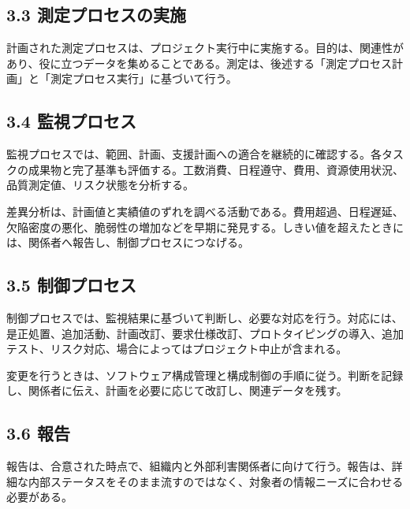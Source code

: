 \documentclass[a4paper,11pt]{ltjsarticle}
\begin{document}
\subsection{3.3 測定プロセスの実施}
計画された測定プロセスは、プロジェクト実行中に実施する。目的は、関連性があり、役に立つデータを集めることである。測定は、後述する「測定プロセス計画」と「測定プロセス実行」に基づいて行う。

\subsection{3.4 監視プロセス}
監視プロセスでは、範囲、計画、支援計画への適合を継続的に確認する。各タスクの成果物と完了基準も評価する。工数消費、日程遵守、費用、資源使用状況、品質測定値、リスク状態を分析する。

差異分析は、計画値と実績値のずれを調べる活動である。費用超過、日程遅延、欠陥密度の悪化、脆弱性の増加などを早期に発見する。しきい値を超えたときには、関係者へ報告し、制御プロセスにつなげる。

\subsection{3.5 制御プロセス}
制御プロセスでは、監視結果に基づいて判断し、必要な対応を行う。対応には、是正処置、追加活動、計画改訂、要求仕様改訂、プロトタイピングの導入、追加テスト、リスク対応、場合によってはプロジェクト中止が含まれる。

変更を行うときは、ソフトウェア構成管理と構成制御の手順に従う。判断を記録し、関係者に伝え、計画を必要に応じて改訂し、関連データを残す。

\begin{center}
\end{center}

\subsection{3.6 報告}
報告は、合意された時点で、組織内と外部利害関係者に向けて行う。報告は、詳細な内部ステータスをそのまま流すのではなく、対象者の情報ニーズに合わせる必要がある。
\end{document}
